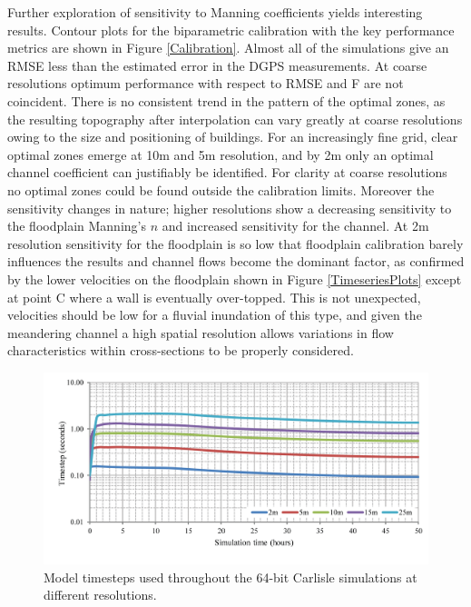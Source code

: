 Further exploration of sensitivity to Manning coefficients yields interesting results. Contour plots for the biparametric calibration with the key performance metrics are shown in Figure \ref{Calibration}. Almost all of the simulations give an RMSE less than the estimated error in the DGPS measurements. At coarse resolutions optimum performance with respect to RMSE and F are not coincident. There is no consistent trend in the pattern of the optimal zones, as the resulting topography after interpolation can vary greatly at coarse resolutions owing to the size and positioning of buildings. For an increasingly fine grid, clear optimal zones emerge at 10m and 5m resolution, and by 2m only an optimal channel coefficient can justifiably be identified. For clarity at coarse resolutions no optimal zones could be found outside the calibration limits. Moreover the sensitivity changes in nature; higher resolutions show a decreasing sensitivity to the floodplain Manning's \(n\) and increased sensitivity for the channel. At 2m resolution sensitivity for the floodplain is so low that floodplain calibration barely influences the results and channel flows become the dominant factor, as confirmed by the lower velocities on the floodplain shown in Figure \ref{TimeseriesPlots} except at point C where a wall is eventually over-topped. This is not unexpected, velocities should be low for a fluvial inundation of this type, and given the meandering channel a high spatial resolution allows variations in flow characteristics within cross-sections to be properly considered.

\begin{figure}[bp]
	\centering
	\includegraphics[width=1.0\textwidth]{carlisle-figures/Figure8.png}
	\caption{Model timesteps used throughout the 64-bit Carlisle simulations at different resolutions.}
	\label{Timesteps}
\end{figure}


